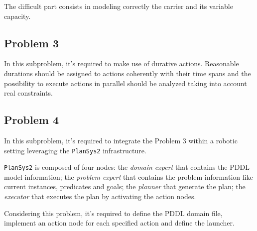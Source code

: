 The difficult part consists in modeling correctly the carrier and its variable capacity.

\subsection{Problem 3}
In this subproblem, it's required to make use of durative actions.
Reasonable durations should be assigned to actions coherently with their time spans and the possibility 
to execute actions in parallel should be analyzed taking into account real constraints.

\subsection{Problem 4}
In this subproblem, it's required to integrate the Problem 3 within a robotic setting leveraging the 
\texttt{PlanSys2} infrastructure.

\texttt{PlanSys2} is composed of four nodes: the \textit{domain expert} that contains the PDDL model 
information; the \textit{problem expert} that contains the problem information like current instances,
predicates and goals; the \textit{planner} that generate the plan; the \textit{executor} that executes
the plan by activating the action nodes.

Considering this problem, it's required to define the PDDL domain file, implement an action node for 
each specified action and define the launcher.


